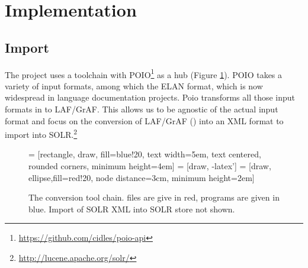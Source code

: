 \documentclass[a4paper,11pt]{article}
\begin{document}
\section{Implementation}
\subsection{Import}
The project uses a toolchain with POIO\footnote{\url{https://github.com/cidles/poio-api}} as a hub (Figure \ref{fig:toolchain}). POIO takes a variety of input formats, among which  the ELAN format, which is now widespread in language documentation projects. Poio transforms all those input formats in to LAF/GrAF. This allows us to be agnostic of the actual input format and focus on the conversion of LAF/GrAF (\cite{IdeRomary2006,IdeSuderman2007}) into an XML format to import into SOLR.\footnote{\url{http://lucene.apache.org/solr/}} 

\begin{figure}[t]
 = [rectangle, draw, fill=blue!20, 
    text width=5em, text centered, rounded corners, minimum height=4em]
 = [draw, -latex']
 = [draw, ellipse,fill=red!20, node distance=3cm,
    minimum height=2em]
\caption{The conversion tool chain. files are give in red, programs are given in blue. Import of SOLR XML into SOLR store not shown.}
\label{fig:toolchain}
\end{figure}
\end{document}
